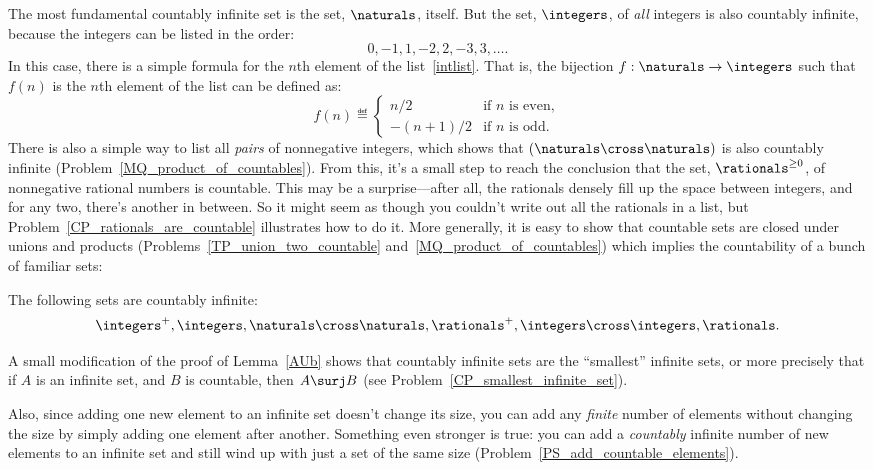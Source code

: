 The most fundamental countably infinite set is the set, $\naturals$,
itself.  But the set, $\integers$, of \emph{all} integers is also
countably infinite, because the integers can be listed in the order:
\begin{equation}\label{intlist}
0,-1,1,-2,2,-3,3,\dots.
\end{equation}
In this case, there is a simple formula for the $n$th element of the
list~\eqref{intlist}.  That is, the bijection $f:\naturals \to
\integers$ such that $f(n)$ is the $n$th element of the list can be
defined as:
\[
f(n) \eqdef \begin{cases} n/2 & \text{if $n$ is even},\\ -(n+1)/2 &
  \text{if $n$ is odd}.
           \end{cases} 
\]    
There is also a simple way to list all \emph{pairs} of nonnegative
integers, which shows that $(\naturals \cross \naturals)$ is also
countably infinite (Problem~\ref{MQ_product_of_countables}).  From
this, it's a small step to reach the conclusion that the set,
$\rationals^{\ge 0}$, of nonnegative rational numbers is countable.
This may be a surprise---after all, the rationals densely fill up the
space between integers, and for any two, there's another in between.
So it might seem as though you couldn't write out all the rationals in
a list, but Problem~\ref{CP_rationals_are_countable} illustrates how
to do it.  More generally, it is easy to show that countable sets are
closed under unions and products
(Problems~\ref{TP_union_two_countable}
and~\ref{MQ_product_of_countables}) which implies the countability of
a bunch of familiar sets:
\begin{corollary}\label{countable_examples}
The following sets are countably infinite:
\[\integers^+, 
 \integers, \naturals \cross \naturals, \rationals^+, \integers \cross
 \integers, \rationals.
\]
\end{corollary}

A small modification of the proof of Lemma~\ref{AUb} shows that
countably infinite sets are the ``smallest'' infinite sets, or more
precisely that if $A$ is an infinite set, and $B$ is countable, then
$A \surj B$ (see Problem~\ref{CP_smallest_infinite_set}).

Also, since adding one new element to an infinite set doesn't change
its size, you can add any \emph{finite} number of elements without
changing the size by simply adding one element after another.
Something even stronger is true: you can add a \emph{countably}
infinite number of new elements to an infinite set and still wind up
with just a set of the same size
(Problem~\ref{PS_add_countable_elements}).

